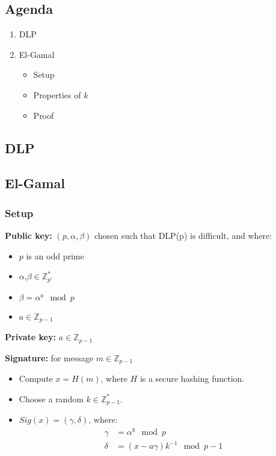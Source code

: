 

\subsection*{Agenda}
\begin{enumerate}
\item DLP
\item El-Gamal
  \begin{itemize}
  \item Setup
  \item Properties of $k$
  \item Proof
  \end{itemize}
\end{enumerate}

\subsection{DLP}


\subsection{El-Gamal}
\subsubsection*{Setup}
\textbf{Public key:} $(p,\alpha,\beta)$ chosen such that DLP(p) is
difficult, and where:
\begin{itemize}
\item $p$ is an odd prime
\item $\alpha$,$\beta \in \mathbb{Z}_{p'}^*$
\item $\beta = \alpha^a \mod p$
\item $a \in \mathbb{Z}_{p-1} $
\end{itemize}

\textbf{Private key:} $a \in \mathbb{Z}_{p-1}$

\textbf{Signature:} for message $m \in \mathbb{Z}_{p-1}$
\begin{itemize}
\item Compute $x = H(m)$, where $H$ is a secure hashing function.
\item Choose a random $k \in \mathbb{Z}_{p-1}^*$.
\item $Sig(x) = (\gamma,\delta)$, where:
  \begin{align*}
    \gamma &= \alpha^k \mod p \\
    \delta &= (x-a\gamma)k^{-1} \mod p-1
  \end{align*}
\end{itemize}

